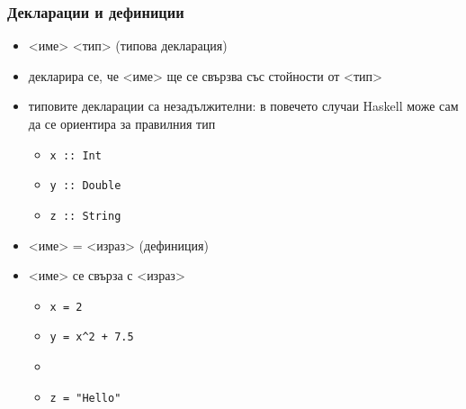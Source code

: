 \documentclass{beamer}
\begin{document}
\begin{frame}
  \frametitle{Декларации и дефиниции}
  \begin{itemize}[<+->]
  \item {}<име> \tta{::} <тип> (типова декларация)
  \item декларира се, че <име> ще се свързва със стойности от <тип>
  \item \alert{типовите декларации са незадължителни: в повечето случаи Haskell може сам да се ориентира за правилния тип}
    \begin{itemize}[<.->]
    \item \tt{x :: Int}
    \item \tt{y :: Double}
    \item \tt{z :: String}
    \end{itemize}
  \item {}<име> \tta= <израз> (дефиниция)
  \item {}<име> се свърза с <израз>
    \begin{itemize}[<.->]
    \item \tt{x = 2}
    \item \tt{y = x\^{}2 + 7.5}
    \item {}
    \item \tt{z = "Hello"}
    \end{itemize}
  \end{itemize}
\end{frame}
\end{document}
